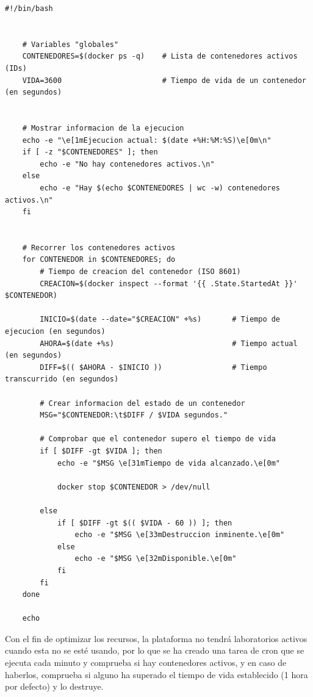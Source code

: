             \begin{lstlisting}[style=bash_style, basicstyle=\ttfamily\scriptsize]
    #!/bin/bash


    # Variables "globales"
    CONTENEDORES=$(docker ps -q)    # Lista de contenedores activos (IDs)
    VIDA=3600                       # Tiempo de vida de un contenedor (en segundos)


    # Mostrar informacion de la ejecucion
    echo -e "\e[1mEjecucion actual: $(date +%H:%M:%S)\e[0m\n"
    if [ -z "$CONTENEDORES" ]; then
        echo -e "No hay contenedores activos.\n"
    else
        echo -e "Hay $(echo $CONTENEDORES | wc -w) contenedores activos.\n"
    fi


    # Recorrer los contenedores activos
    for CONTENEDOR in $CONTENEDORES; do
        # Tiempo de creacion del contenedor (ISO 8601)
        CREACION=$(docker inspect --format '{{ .State.StartedAt }}' $CONTENEDOR)

        INICIO=$(date --date="$CREACION" +%s)       # Tiempo de ejecucion (en segundos)
        AHORA=$(date +%s)                           # Tiempo actual (en segundos)
        DIFF=$(( $AHORA - $INICIO ))                # Tiempo transcurrido (en segundos)

        # Crear informacion del estado de un contenedor
        MSG="$CONTENEDOR:\t$DIFF / $VIDA segundos."

        # Comprobar que el contenedor supero el tiempo de vida
        if [ $DIFF -gt $VIDA ]; then
            echo -e "$MSG \e[31mTiempo de vida alcanzado.\e[0m"
            
            docker stop $CONTENEDOR > /dev/null

        else
            if [ $DIFF -gt $(( $VIDA - 60 )) ]; then
                echo -e "$MSG \e[33mDestruccion inminente.\e[0m"
            else
                echo -e "$MSG \e[32mDisponible.\e[0m"
            fi
        fi
    done

    echo
            \end{lstlisting}
    
            \newpage

            Con el fin de optimizar los recursos, la plataforma no tendrá laboratorios activos cuando esta no se esté usando, por lo que se ha creado una tarea de cron que se ejecuta cada minuto y comprueba si hay contenedores activos, y en caso de haberlos, comprueba si alguno ha superado el tiempo de vida establecido (1 hora por defecto) y lo destruye.

